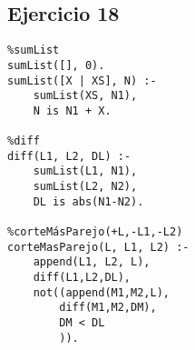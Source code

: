 \documentclass[10pt,a4paper]{article}
\begin{document}
\subsection{Ejercicio 18}
\begin{centrado}
\begin{verbatim}
%sumList
sumList([], 0).
sumList([X | XS], N) :-
	sumList(XS, N1),
	N is N1 + X.

%diff
diff(L1, L2, DL) :-
	sumList(L1, N1),
	sumList(L2, N2),
	DL is abs(N1-N2).

%corteMásParejo(+L,-L1,-L2)
corteMasParejo(L, L1, L2) :-
	append(L1, L2, L),
	diff(L1,L2,DL),
	not((append(M1,M2,L), 
		diff(M1,M2,DM),
		DM < DL
		)).
\end{verbatim}
\end{centrado}
%
%
%
%
%
%
\end{document}
